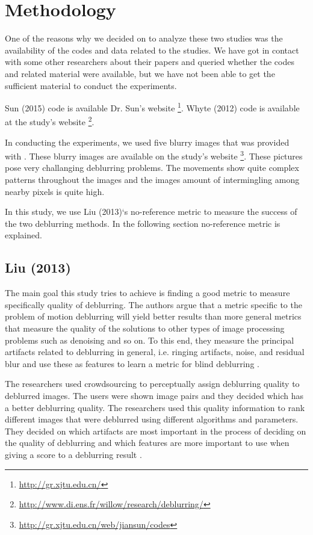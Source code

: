 \documentclass[10pt,twocolumn,letterpaper]{article}
\begin{document}
 



\section{Methodology}

One of the reasons why we decided on to analyze these two studies was the availability of the codes and data related to the studies. We have got in contact with some other researchers about their papers and queried whether the codes and related material were available, but we have not been able to get the sufficient material to conduct the experiments.

Sun \etal (2015) code is available Dr. Sun's website \footnote{\url{http://gr.xjtu.edu.cn/}}. Whyte \etal (2012) code is available at the study's website \footnote{\url{http://www.di.ens.fr/willow/research/deblurring/}}.

In conducting the experiments, we used five blurry images that was provided with \cite{whyte2012non}. These blurry images are available on the study's website \footnote{\url{http://gr.xjtu.edu.cn/web/jiansun/codes}}. These pictures pose very challanging deblurring problems. The movements show quite complex patterns throughout the images and the images amount of intermingling among nearby pixels is quite high.

In this study, we use Liu \etal (2013)`s no-reference metric to measure the success of the two deblurring methods. In the following section no-reference metric is explained.

\subsection{Liu \textbf{\etal} (2013)}
The main goal this study tries to achieve is finding a good metric to measure specifically quality of deblurring. The authors argue that a metric specific to the problem of motion deblurring will yield better results than more general metrics that measure the quality of the solutions to other types of image processing problems such as denoising and so on. To this end, they measure the principal artifacts related to deblurring in general, i.e. ringing artifacts, noise, and residual blur and use these as features to learn a metric for blind deblurring \cite{liu2013no}.

The researchers used crowdsourcing to perceptually assign deblurring quality to deblurred images. The users were shown image pairs and they decided which has a better deblurring quality. The researchers used this quality information to rank different images that were deblurred using different algorithms and parameters. They decided on which artifacts are most important in the process of deciding on the quality of deblurring and which features are more important to use when giving a score to a deblurring result \cite{liu2013no}.
\end{document}
